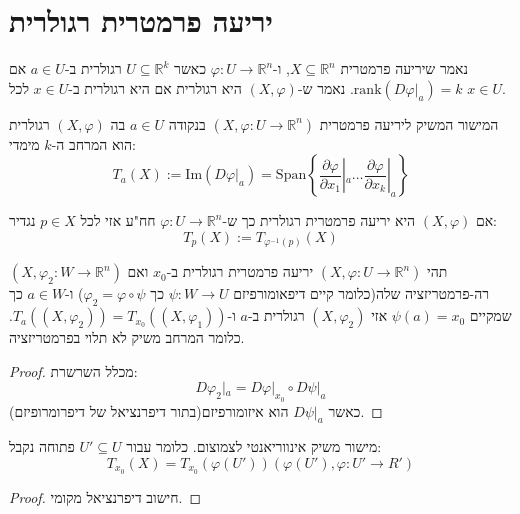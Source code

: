 \documentclass{tstextbook}
\begin{document}
\section{יריעה פרמטרית רגולרית}

\begin{definition}
נאמר שיריעה פרמטרית \(X\subseteq \mathbb{R}^{n}\), ו-\(\varphi:U\to \mathbb{R}^{n}\) כאשר \(U\subseteq \mathbb{R}^{k}\) רגולרית ב-\(a \in U\) אם \(\mathrm{rank}(D\varphi|_{a})=k\). נאמר ש-\((X,\varphi )\) היא רגולרית אם היא רגולרית ב-\(x \in U\) לכל \(x \in U\).

\end{definition}
\begin{definition}
המישור המשיק ליריעה פרמטרית \((X,\varphi:U\to \mathbb{R}^{n})\) בנקודה \(a \in U\) בה \((X,\varphi)\) רגולרית הוא המרחב ה-\(k\) מימדי:
$$T_{a}(X):= \mathrm{Im}(D\varphi|_{a})=\mathrm{Span}\left\{  \frac{\partial \varphi}{\partial x_{1}} |_{a} \dots \frac{\partial \varphi}{\partial x_{k}} |_{a}  \right\}$$

\end{definition}
\begin{definition}
אם \((X,\varphi)\) היא יריעה פרמטרית רגולרית כך ש-\(\varphi:U\to \mathbb{R}^{n}\) חח"ע אזי לכל \(p \in X\) נגדיר:
$$T_{p}(X):= T_{\varphi ^{-1} (p)}(X)$$

\end{definition}
\begin{proposition}
תהי \((X,\varphi:U\to \mathbb{R}^{n})\) יריעה פרמטרית רגולרית ב-\(x_{0}\) ואם \((X,\varphi_{2}:W\to \mathbb{R}^{n})\) רה-פרמטריזציה שלה(כלומר קיים דיפאומורפיזם \(\psi:W\to U\) כך \(\varphi_{2}=\varphi \circ \psi\)) ו-\(a \in W\) כך שמקיים \(\psi(a)=x_{0}\) אזי \((X,\varphi_{2})\) רגולרית ב-\(a\) ו-\(T_{a}((X,\varphi_{2}))=T_{x_{0}}((X,\varphi_{1}))\). כלומר המרחב משיק לא תלוי בפרמטריזציה.

\end{proposition}
\begin{proof}
מכלל השרשרת:
$$D\varphi_{2}|_{a} = D\varphi|_{x_{0}}\circ D\psi|_{a}$$
כאשר \(D\psi|_{a}\) הוא איזומורפיזם(בתור דיפרנציאל של דיפרומרופיזם).

\end{proof}
\begin{proposition}
מישור משיק אינווריאנטי לצמוצום. כלומר עבור \(U' \subseteq U\) פתוחה נקבל:
$$T_{x_{0}}(X)=T_{x_{0}}(\varphi(U' ))(\varphi(U'),\varphi:U'\to R')$$

\end{proposition}
\begin{proof}
חישוב דיפרנציאל מקומי.

\end{proof}
\end{document}
